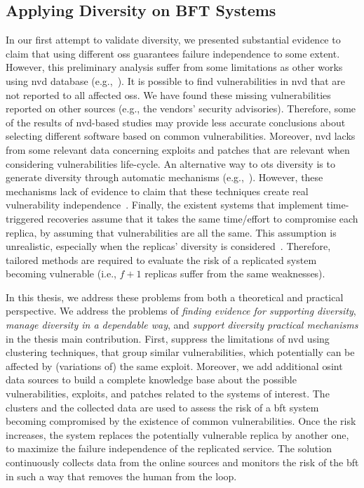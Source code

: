 \subsection{Applying Diversity on BFT Systems}
In our first attempt to validate diversity, we presented substantial evidence to claim that using different \glspl{os} guarantees failure independence to some extent.
However, this preliminary analysis suffer from some limitations as other works using \gls{nvd} database (e.g.,~\cite{Han:2009,Frei:2010,Shahzad:2012,Bozorgi:2010,Allodi:2014,Gorbenko:2017}).
It is possible to find vulnerabilities in \gls{nvd} that are not reported to all affected \glspl{os}.
We have found these missing vulnerabilities reported on other sources (e.g., the vendors' security advisories).
Therefore, some of the results of \gls{nvd}-based studies may provide less accurate conclusions about selecting different software based on common vulnerabilities.
Moreover, \gls{nvd} lacks from some relevant data concerning exploits and patches that are relevant when considering vulnerabilities life-cycle.
An alternative way to \gls{ots} diversity is to generate diversity through automatic mechanisms (e.g.,~\cite{Roeder:2010,Amir:2011}).
However, these mechanisms lack of evidence to claim that these techniques create real vulnerability independence~\cite{Snow:2013,Bittau:2014}. 
Finally, the existent systems that implement time-triggered recoveries assume that it takes the same time/effort to compromise each replica, by assuming that vulnerabilities are all the same. 
This assumption is unrealistic, especially when the replicas' diversity is considered~\cite{Nayak:2014}. 
Therefore, tailored methods are required to evaluate the risk of a replicated system becoming vulnerable (i.e., $f+1$ replicas suffer from the same weaknesses).


In this thesis, we address these problems from both a theoretical and practical perspective.
We address the problems of \emph{finding evidence for supporting diversity}, \emph{manage diversity in a dependable way}, and \emph{support diversity practical mechanisms} in the thesis main contribution.
First, suppress the limitations of \gls{nvd} using clustering techniques, that group similar vulnerabilities, which potentially can be affected by (variations of) the same exploit.
Moreover, we add additional \gls{osint} data sources to build a complete knowledge base about the possible vulnerabilities, exploits, and patches related to the systems of interest. 
The clusters and the collected data are used to assess the risk of a \gls{bft} system becoming compromised by the existence of common vulnerabilities.
Once the risk increases, the system replaces the potentially vulnerable replica by another one, to maximize the failure independence of the replicated service.
The solution continuously collects data from the online sources and monitors the risk of the \gls{bft} in such a way that removes the human from the loop.

